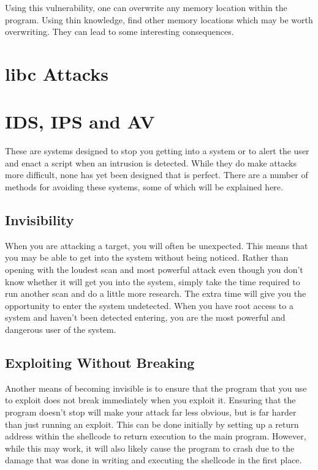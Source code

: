 			Using this vulnerability, one can overwrite any memory location within the program.
			Using thin knowledge, find other memory locations which may be worth overwriting.
			They can lead to some interesting consequences.
	\section{libc Attacks}
	\section{IDS, IPS and AV}
	  
		These are systems designed to stop you getting into a system or to alert the user and enact a script when an intrusion is detected.
		While they do make attacks more difficult, none has yet been designed that is perfect.
		There are a number of methods for avoiding these systems, some of which will be explained here.

		\subsection{Invisibility}
			When you are attacking a target, you will often be unexpected.
			This means that you may be able to get into the system without being noticed.
			Rather than opening with the loudest scan and most powerful attack even though you don't know whether it will get you into the system,
			simply take the time required to run another scan and do a little more research.
			The extra time will give you the opportunity to enter the system undetected.
			When you have root access to a system and haven't been detected entering, you are the most powerful and dangerous user of the system.

		\subsection{Exploiting Without Breaking}
			Another means of becoming invisible is to ensure that the program that you use to exploit does not break immediately when you exploit it.
			Ensuring that the program doesn't stop will make your attack far less obvious, but is far harder than just running an exploit.
			This can be done initially by setting up a return address within the shellcode to return execution to the main program.
			However, while this may work, it will also likely cause the program to crash due to the damage that was done in writing and executing the shellcode in the first place.

